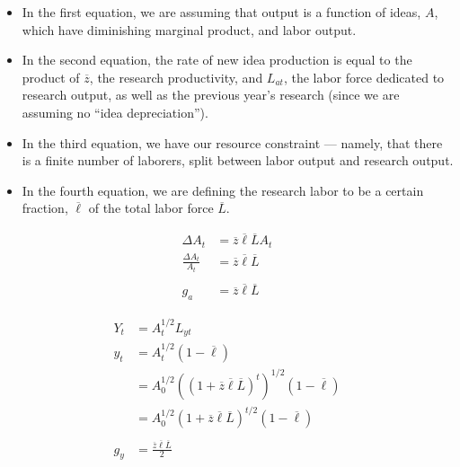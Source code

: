 \documentclass[10pt]{extarticle}
\begin{document}
  \begin{solution}
    \begin{tcolorbox}[colback = white, title = (a), breakable]
      \begin{itemize}
        \item In the first equation, we are assuming that output is a function of ideas, $A$, which have diminishing marginal product, and labor output.
        \item In the second equation, the rate of new idea production is equal to the product of $\overline{z}$, the research productivity, and $L_{at}$, the labor force dedicated to research output, as well as the previous year's research (since we are assuming no ``idea depreciation'').
        \item In the third equation, we have our resource constraint --- namely, that there is a finite number of laborers, split between labor output and research output.
        \item In the fourth equation, we are defining the research labor to be a certain fraction, $\overline{\ell}$ of the total labor force $\overline{L}$.
      \end{itemize}
    \end{tcolorbox}
    \begin{tcolorbox}[colback = white, title = (b), breakable]
      \begin{align*}
        \Delta A_t &= \overline{z}\overline{\ell}\overline{L}A_t \\
        \frac{\Delta A_t}{A_t} &= \overline{z}\overline{\ell}\overline{L}\\
        \\
        g_a &= \boxed{\overline{z}\overline{\ell}\overline{L}}
      \end{align*}
    \end{tcolorbox}
    \begin{tcolorbox}[colback = white, title = (c) and (d), breakable]
      \begin{align*}
        Y_t &= A_t^{1/2}L_{yt} \\
        y_t &= A_t^{1/2} (1-\overline{\ell}) \\
            &= A_0^{1/2} \left((1 + \overline{z}\overline{\ell}\overline{L})^t\right)^{1/2} (1-\overline{\ell}) \\
            &=  A_0^{1/2} (1 + \overline{z}\overline{\ell}\overline{L})^{t/2} (1-\overline{\ell}) \\
            \\
        g_y &= \frac{\overline{z}\overline{\ell}\overline{L}}{2}
      \end{align*}
    \end{tcolorbox}
  \end{solution}
\end{document}
